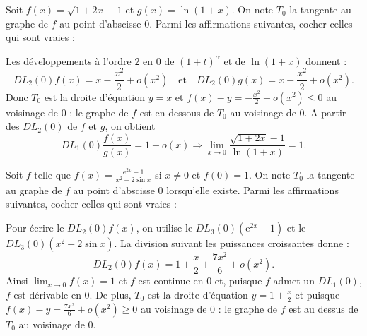 \begin{question}
Soit $\displaystyle f(x)=\sqrt{1+2x}-1$ et $g(x)=\ln (1+x)$. On note $T_0$ la tangente au graphe de $f$ au point d'abscisse $0$. Parmi les affirmations suivantes, cocher celles qui sont vraies :
\begin{answers}  
\end{answers}
\vskip2mm
\begin{explanations}
Les développements à l'ordre $2$ en $0$ de $(1+t)^{\alpha}$ et de $\ln (1+x)$ donnent :
$$\displaystyle DL_2(0)f(x)=x-\frac{x^2}{2}+o(x^2)\quad \mbox{et}\quad DL_2(0)g(x)=x-\frac{x^2}{2}+o(x^2).$$
Donc $T_0$ est la droite d'équation $y=x$ et $\displaystyle f(x)-y=-\frac{x^2}{2}+o(x^2)\leq 0$ au voisinage de $0$ : le graphe de $f$ est en dessous de $T_0$ au voisinage de $0$. A partir des $DL_2(0)$ de $f$ et $g$, on obtient 
$$ DL_1(0)\frac{f(x)}{g(x)}=1+o(x)\Rightarrow \lim _{x\to 0}\frac{\sqrt{1+2x}-1}{\ln (1+x)}=1.$$
\end{explanations}
\end{question}

\begin{question}
Soit $f$ telle que $\displaystyle f(x)=\frac{\mathrm{e}^{2x}-1}{x^2+2\sin x}$ si $x\neq 0$ et $f(0)=1$. On note $T_0$ la tangente au graphe de $f$ au point d'abscisse $0$ lorsqu'elle existe. Parmi les affirmations suivantes, cocher celles qui sont vraies :
\begin{answers}  
\end{answers}
\vskip2mm
\begin{explanations}
Pour écrire le $DL_2(0)f(x)$, on utilise le $DL_3(0)(\mathrm{e}^{2x}-1)$ et le $DL_3(0)(x^2+2\sin x)$. La division suivant les puissances croissantes donne :
$$\displaystyle DL_2(0)f(x)=1+\frac{x}{2}+\frac{7x^2}{6}+o(x^2).$$
Ainsi $\displaystyle \lim _{x\to 0}f(x)=1$ et $f$ est continue en $0$ et, puisque $f$ admet un $DL_1(0)$, $f$ est dérivable en $0$. De plus, $T_0$ est la droite d'équation $\displaystyle y=1+\frac{x}{2}$ et puisque $\displaystyle f(x)-y=\frac{7x^2}{6}+o(x^2)\geq 0$ au voisinage de $0$ : le graphe de $f$ est au dessus de $T_0$ au voisinage de $0$.
\end{explanations}
\end{question}


